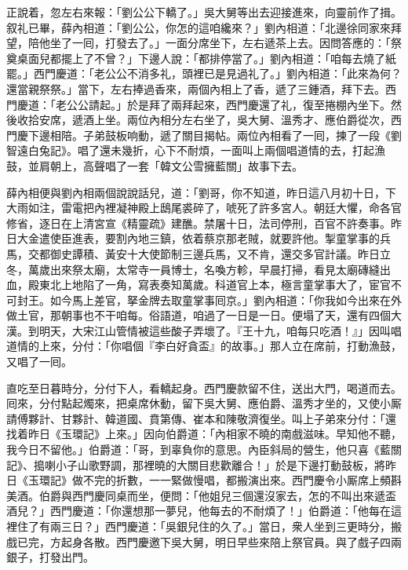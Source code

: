 正說着，忽左右來報：「劉公公下轎了。」吳大舅等出去迎接進來，向靈前作了揖。叙礼已畢，薛內相道：「劉公公，你怎的這咱纔來？」劉內相道：「北邊徐同家來拜望，陪他坐了一囘，打發去了。」一面分席坐下，左右遞茶上去。因問答應的：「祭奠桌面兒都擺上了不曾？」下邊人說：「都排停當了。」劉內相道：「咱每去燒了紙罷。」西門慶道：「老公公不消多礼，頭裡已是見過礼了。」劉內相道：「此來為何？還當親祭祭。」當下，左右捧過香來，兩個內相上了香，遞了三鍾酒，拜下去。西門慶道：「老公公請起。」於是拜了兩拜起來，西門慶還了礼，復至捲棚內坐下。然後收拾安席，遞酒上坐。兩位內相分左右坐了，吳大舅、溫秀才、應伯爵從次，西門慶下邊相陪。子弟鼓板响動，遞了關目揭帖。兩位內相看了一囘，揀了一段《劉智遠白兔記》。唱了還未幾折，心下不耐煩，一面叫上兩個唱道情的去，打起漁鼓，並肩朝上，高聲唱了一套「韓文公雪擁藍關」故事下去。

薛內相便與劉內相兩個說說話兒，道：「劉哥，你不知道，昨日這八月初十日，下大雨如注，雷電把內裡凝神殿上鴟尾裘碎了，唬死了許多宮人。朝廷大懼，命各官修省，逐日在上清宮宣《精靈疏》建醮。禁屠十日，法司停刑，百官不許奏事。昨日大金遣使臣進表，要割內地三鎮，依着蔡京那老賊，{}就要許他。掣童掌事的兵馬，交都御史譚積、黃安十大使節制三邊兵馬，又不肯，還交多官計議。昨日立冬，萬歲出來祭太廟，太常寺一員博士，名喚方軫，早晨打掃，看見太廟磚縫出血，殿東北上地陷了一角，{}寫表奏知萬歲。科道官上本，極言童掌事大了，宦官不可封王。如今馬上差官，拏金牌去取童掌事囘京。」劉內相道：「你我如今出來在外做土官，那朝事也不干咱每。俗語道，咱過了一日是一日。便塌了天，還有四個大漢。到明天，大宋江山管情被這些酸子弄壞了。{}『王十九，咱每只吃酒！』」因叫唱道情的上來，分付：「你唱個『李白好貪盃』的故事。」{}那人立在席前，打動漁鼓，又唱了一囘。

直吃至日暮時分，分付下人，看轎起身。西門慶款留不住，送出大門，喝道而去。囘來，分付點起燭來，把桌席休動，留下吳大舅、應伯爵、溫秀才坐的，又使小厮請傅夥計、甘夥計、韓道國、賁第傳、崔本和陳敬濟復坐。叫上子弟來分付：「還找着昨日《玉環記》上來。」因向伯爵道：「內相家不曉的南戲滋味。早知他不聽，我今日不留他。」伯爵道：「哥，到辜負你的意思。內臣斜局的營生，他只喜《藍關記》、搗喇小子山歌野調，那裡曉的大關目悲歡離合！」於是下邊打動鼓板，將昨日《玉環記》做不完的折數，一一緊做慢唱，都搬演出來。西門慶令小厮席上頻斟美酒。伯爵與西門慶同桌而坐，便問：「他姐兒三個還沒家去，怎的不叫出來遞盃酒兒？」{}西門慶道：「你還想那一夢兒，他每去的不耐煩了！」伯爵道：「他每在這裡住了有兩三日？」西門慶道：「吳銀兒住的久了。」當日，衆人坐到三更時分，搬戲已完，方起身各散。西門慶邀下吳大舅，明日早些來陪上祭官員。與了戲子四兩銀子，打發出門。

